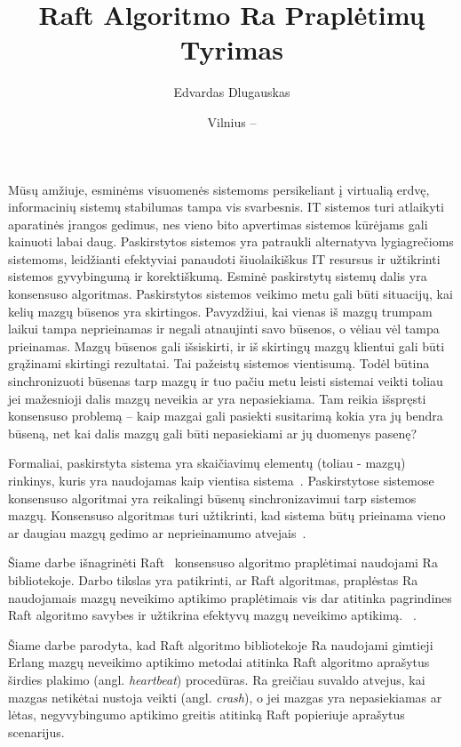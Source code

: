 \documentclass{VUMIFPSkursinis}
\title{Raft Algoritmo Ra Praplėtimų Tyrimas}
\author{Edvardas Dlugauskas}
\date{Vilnius – \the\year}
\begin{document}
\maketitle
\listoftodos
\tableofcontents


Mūsų amžiuje, esminėms visuomenės sistemoms persikeliant į virtualią erdvę, informacinių sistemų stabilumas tampa vis svarbesnis. IT sistemos turi atlaikyti aparatinės įrangos gedimus, nes vieno bito apvertimas sistemos kūrėjams gali kainuoti labai daug. Paskirstytos sistemos yra patraukli alternatyva lygiagrečioms sistemoms, leidžianti efektyviai panaudoti šiuolaikiškus IT resursus ir užtikrinti sistemos gyvybingumą ir korektiškumą. Esminė paskirstytų sistemų dalis yra konsensuso algoritmas. Paskirstytos sistemos veikimo metu gali būti situacijų, kai kelių mazgų būsenos yra skirtingos. Pavyzdžiui, kai vienas iš mazgų trumpam laikui tampa neprieinamas ir negali atnaujinti savo būsenos, o vėliau vėl tampa prieinamas. Mazgų būsenos gali išsiskirti, ir iš skirtingų mazgų klientui gali būti grąžinami skirtingi rezultatai. Tai pažeistų sistemos vientisumą. Todėl būtina sinchronizuoti būsenas tarp mazgų ir tuo pačiu metu leisti sistemai veikti toliau jei mažesnioji dalis mazgų neveikia ar yra nepasiekiama. Tam reikia išspręsti konsensuso problemą -- kaip mazgai gali pasiekti susitarimą kokia yra jų bendra būseną, net kai dalis mazgų gali būti nepasiekiami ar jų duomenys pasenę?

Formaliai, paskirstyta sistema yra skaičiavimų elementų (toliau - mazgų) rinkinys, kuris yra naudojamas kaip vientisa sistema~\cite{steen_distributed_2017}. Paskirstytose sistemose konsensuso algoritmai yra reikalingi būsenų sinchronizavimui tarp sistemos mazgų. Konsensuso algoritmas turi užtikrinti, kad sistema būtų prieinama vieno ar daugiau mazgų gedimo ar neprieinamumo atvejais~\cite{ongaro_consensus}. 

Šiame darbe išnagrinėti Raft~\cite{ongaro_consensus} konsensuso algoritmo praplėtimai naudojami Ra bibliotekoje. Darbo tikslas yra patikrinti, ar Raft algoritmas, praplėstas Ra naudojamais mazgų neveikimo aptikimo praplėtimais vis dar atitinka pagrindines Raft algoritmo savybes ir užtikrina efektyvų mazgų neveikimo aptikimą. ~\cite{ongaro_consensus, rabbitmqra}.

Šiame darbe parodyta, kad Raft algoritmo bibliotekoje Ra naudojami gimtieji Erlang mazgų neveikimo aptikimo metodai atitinka Raft algoritmo aprašytus širdies plakimo (angl. \textit{heartbeat}) procedūras. Ra greičiau suvaldo atvejus, kai mazgas netikėtai nustoja veikti (angl. \textit{crash}), o jei mazgas yra nepasiekiamas ar lėtas, negyvybingumo aptikimo greitis atitinką Raft popieriuje aprašytus scenarijus.
\end{document}

